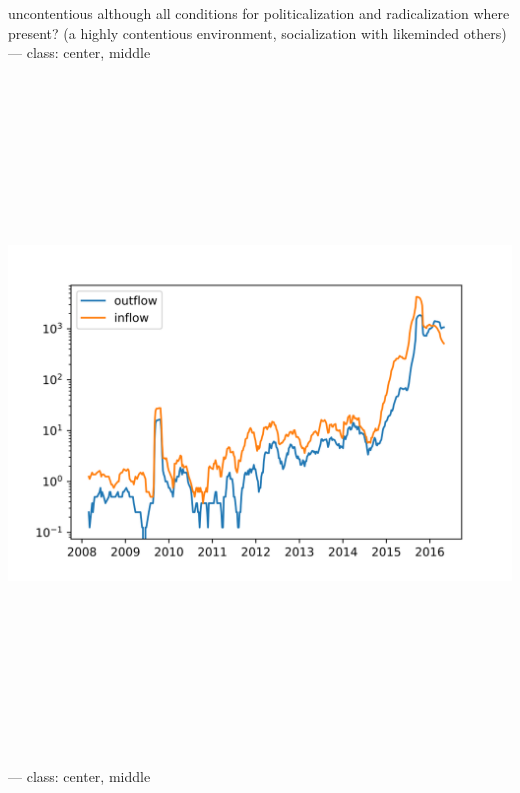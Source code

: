 \documentclass[ignorenonframetext,]{beamer}
\begin{document}
\begin{frame}
uncontentious although all conditions for politicalization and
radicalization where present? (a highly contentious environment,
socialization with likeminded others) --- class: center, middle
\includegraphics[width=7.29167in,height=7.29167in]{outflow_inflow.svg}
--- class: center, middle

\end{frame}
\end{document}
